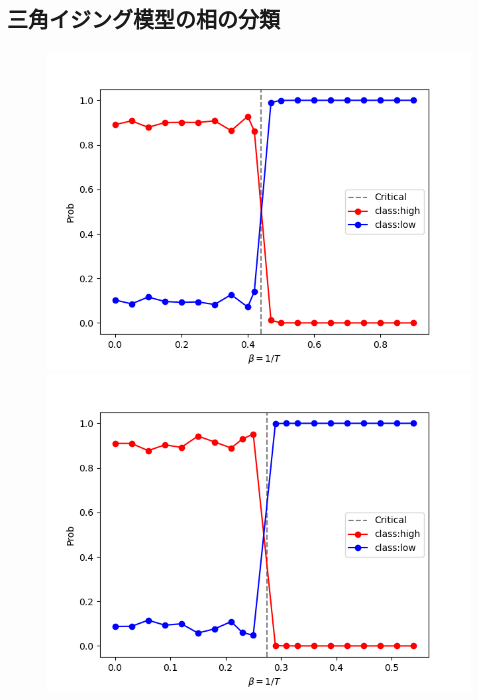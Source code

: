 \documentclass[a4paper,11pt]{jsreport}
\begin{document}
\subsection{三角イジング模型の相の分類}



\begin{figure}[H]
  \begin{minipage}[b]{0.45\linewidth}
    \begin{center}
      \includegraphics[keepaspectratio, scale=0.4]{image/分類機_正方イジング_FCNN.png}
    \end{center}  
  \end{minipage}
  \begin{minipage}[b]{0.45\linewidth}
    \begin{center}
      \includegraphics[keepaspectratio, scale=0.4]{image/分類機_三角イジング_FCNN.png}
    \end{center}
  \end{minipage}
\end{figure}
\end{document}
